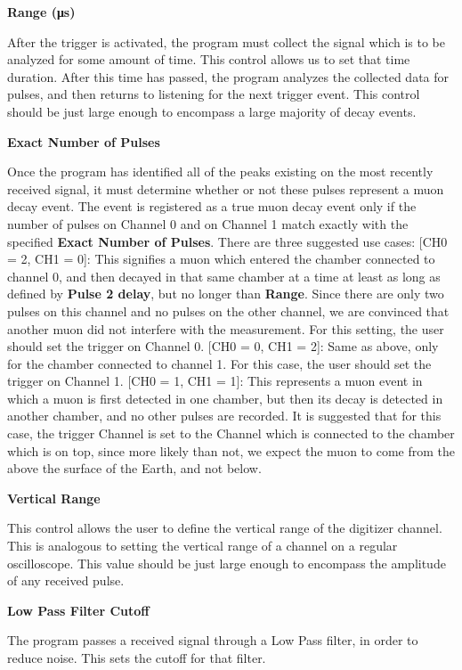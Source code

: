 \documentclass{../lab}
\begin{document}
\textbf{Range (μs)}

After the trigger is activated, the program must collect the signal which is to be analyzed for some amount of time. This control allows us to set that time duration. After this time has passed, the program analyzes the collected data for pulses, and then returns to listening for the next trigger event. This control should be just large enough to encompass a large majority of decay events.

\textbf{Exact Number of Pulses}

Once the program has identified all of the peaks existing on the most recently received signal, it must determine whether or not these pulses represent a muon decay event. The event is registered as a true muon decay event only if the number of pulses on Channel 0 and on Channel 1 match exactly with the specified \textbf{Exact Number of Pulses}. There are three suggested use cases: [CH0 = 2, CH1 = 0]: This signifies a muon which entered the chamber connected to channel 0, and then decayed in that same chamber at a time at least as long as defined by \textbf{Pulse 2 delay}, but no longer than \textbf{Range}. Since there are only two pulses on this channel and no pulses on the other channel, we are convinced that another muon did not interfere with the measurement. For this setting, the user should set the trigger on Channel 0. [CH0 = 0, CH1 = 2]: Same as above, only for the chamber connected to channel 1. For this case, the user should set the trigger on Channel 1. [CH0 = 1, CH1 = 1]: This represents a muon event in which a muon is first detected in one chamber, but then its decay is detected in another chamber, and no other pulses are recorded. It is suggested that for this case, the trigger Channel is set to the Channel which is connected to the chamber which is on top, since more likely than not, we expect the muon to come from the above the surface of the Earth, and not below.

\textbf{Vertical Range}

This control allows the user to define the vertical range of the digitizer channel. This is analogous to setting the vertical range of a channel on a regular oscilloscope. This value should be just large enough to encompass the amplitude of any received pulse.

\textbf{Low Pass Filter Cutoff}

The program passes a received signal through a Low Pass filter, in order to reduce noise. This sets the cutoff for that filter.
\end{document}
